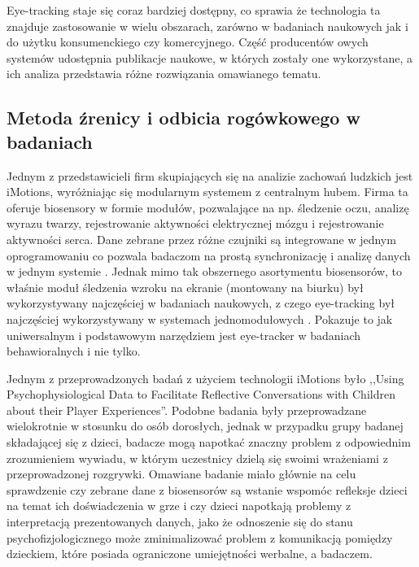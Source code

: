 \documentclass[a4paper,twoside,12pt]{book}
\begin{document}
Eye-tracking staje się coraz bardziej dostępny, co sprawia że technologia ta znajduje zastosowanie w wielu obszarach, zarówno w badaniach naukowych jak i do użytku konsumenckiego czy komercyjnego. Część producentów owych systemów udostępnia publikacje naukowe, w których zostały one wykorzystane, a ich analiza przedstawia różne rozwiązania omawianego tematu.

\subsection{Metoda źrenicy i odbicia rogówkowego w badaniach}
\label{subsec:metoda-zrenicy-i-odbicia-rogowkowego-w-badaniach}

Jednym z przedstawicieli firm skupiających się na analizie zachowań ludzkich jest iMotions, wyróżniając się modularnym systemem z centralnym hubem. Firma ta oferuje biosensory w formie modułów, pozwalające na np. śledzenie oczu, analizę wyrazu twarzy, rejestrowanie aktywności elektrycznej mózgu i rejestrowanie aktywności serca. Dane zebrane przez różne czujniki są integrowane w jednym oprogramowaniu co pozwala badaczom na prostą synchronizację i analizę danych w jednym systemie \cite{bib:iMotions-about-us}. Jednak mimo tak obszernego asortymentu biosensorów, to właśnie moduł śledzenia wzroku na ekranie (montowany na biurku) był wykorzystywany najczęściej w badaniach naukowych, z czego eye-tracking był najczęściej wykorzystywany w systemach jednomodułowych \cite{bib:iMotions-2023-report}. Pokazuje to jak uniwersalnym i podstawowym narzędziem jest eye-tracker w badaniach behawioralnych i nie tylko. 

Jednym z przeprowadzonych badań z użyciem technologii iMotions było ,,Using Psychophysiological Data to Facilitate Reflective Conversations with Children about their Player Experiences''. Podobne badania były przeprowadzane wielokrotnie w stosunku do osób dorosłych, jednak w przypadku grupy badanej składającej się z dzieci, badacze mogą napotkać znaczny problem z odpowiednim zrozumieniem wywiadu, w którym uczestnicy dzielą się swoimi wrażeniami z przeprowadzonej rozgrywki. Omawiane badanie miało głównie na celu sprawdzenie czy zebrane dane z biosensorów są wstanie wspomóc refleksje dzieci na temat ich doświadczenia w grze i czy dzieci napotkają problemy z interpretacją prezentowanych danych, jako że odnoszenie się do stanu psychofizjologicznego może zminimalizować problem z komunikacją pomiędzy dzieckiem, które posiada ograniczone umiejętności werbalne, a badaczem. 
\end{document}
